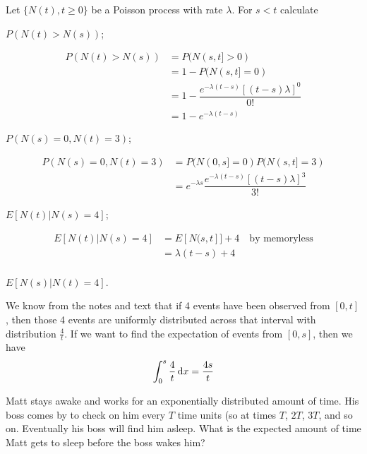 \documentclass[10pt,a4paper]{exam}
\begin{document}
\begin{questions}
\pagebreak

\question  Let $\{N(t), t \geq 0 \}$ be a Poisson process with rate $\lambda$. For $s < t$ calculate
\begin{parts}
\item $P(N(t) > N(s))$;
\begin{solution}
\begin{align*}
P(N(t) > N(s)) 	&= P(N(s,t] > 0)\\
						&= 1 - P(N(s, t] = 0)\\
						&= 1 - \dfrac{e^{-\lambda (t-s)}\left[(t-s)\lambda\right]^0}{0!}\\
						&= 1 - e^{-\lambda(t-s)}
\end{align*}
\end{solution}
\item $P(N(s) = 0, N(t) = 3)$;
\begin{solution}
\begin{align*}
P(N(s) = 0, N(t) = 3)		&= P(N(0,s] = 0)P(N(s,t] = 3)\\
									&= e^{-\lambda s}\dfrac{e^{-\lambda (t-s)}\left[(t-s)\lambda\right]^3}{3!}
\end{align*}
\end{solution}
\item $E[N(t)|N(s) = 4]$;
\begin{solution}
\begin{align*}
E[N(t)|N(s) = 4] 	&= E[N(s,t]] + 4 \quad \text{by memoryless}\\
							&= \lambda(t-s) + 4\\
\end{align*}
\end{solution}
\item $E[N(s)|N(t) = 4]$.

\begin{solution}
We know from the notes and text that if 4 events have been observed from $[0,t]$, then those 4 events are uniformly distributed across that interval with distribution $\frac{4}{t}$. If we want to find the expectation of events from $[0,s]$, then we have
$$\int_0^s \frac{4}{t} \dif x = \frac{4s}{t}$$
\end{solution}
\end{parts}

\question Matt stays awake and works for an exponentially distributed amount of time. His boss comes by to check on him every $T$ time units (so at times $T$, $2T$, $3T$, and so on. Eventually his boss will find him asleep. What is the expected amount of time Matt gets to sleep before the boss wakes him?


\end{questions}
\end{document}
